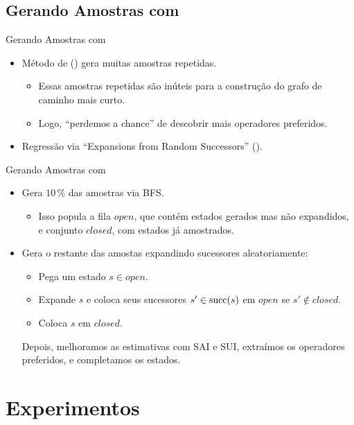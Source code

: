 \documentclass{beamer}
\begin{document}
\subsection{Gerando Amostras com \bfsrs}
\begin{frame}{Gerando Amostras com \bfsrs}
\begin{itemize}
  \item Método de \cite{Bettker.etal/2022} (\bfsrw) gera muitas \alert{amostras repetidas}.
  \begin{itemize}
    \item Essas amostras repetidas são inúteis para a construção do grafo de caminho mais curto.
    \item Logo, ``perdemos a chance'' de descobrir mais operadores preferidos.
  \end{itemize}
  \pause
  \item Regressão via ``\alert{Expansions from Random Successors}'' (\alert{\bfsrs}).
\end{itemize}
\end{frame}

\begin{frame}{Gerando Amostras com \bfsrs}
\begin{itemize}
  \item Gera $10\,\%$ das amostras via \alert{BFS}.
  \begin{itemize}
    \item Isso popula a fila \alert{$open$}, que contém estados gerados mas não expandidos, e conjunto \alert{$closed$}, com estados já amostrados.
  \end{itemize}
  \pause
  \item Gera o restante das amostas \alert{expandindo sucessores aleatoriamente}:
  \begin{itemize}
    \item Pega um estado $s \in open$.
    \pause
    \item Expande $s$ e coloca seus sucessores $s' \in \operatorname{succ}(s)$ em $open$ se $s' \notin closed$.
    \pause
    \item Coloca $s$ em $closed$.
  \end{itemize}
\pause
\vspace{1.0cm}
Depois, melhoramos as estimativas com SAI e SUI, extraímos os operadores preferidos, e completamos os estados.
\end{itemize}
\end{frame}


\section{Experimentos}
\end{document}
